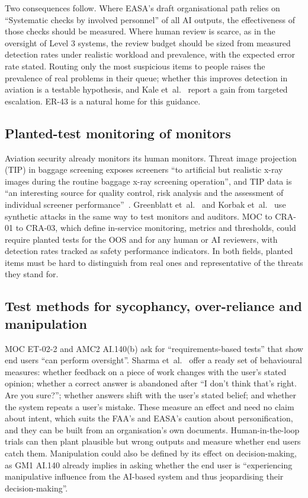 \documentclass[11pt]{article}
\begin{document}
Two consequences follow. Where EASA's draft organisational path relies on ``Systematic checks by involved personnel'' of all AI outputs, the effectiveness of those checks should be measured. Where human review is scarce, as in the oversight of Level 3 systems, the review budget should be sized from measured detection rates under realistic workload and prevalence, with the expected error rate stated. Routing only the most suspicious items to people raises the prevalence of real problems in their queue; whether this improves detection in aviation is a testable hypothesis, and Kale et~al.~\cite{kale2025monitoring} report a gain from targeted escalation. ER-43 is a natural home for this guidance.

\subsection{Planted-test monitoring of monitors}\label{sec:planted}

Aviation security already monitors its human monitors. Threat image projection (TIP) in baggage screening exposes screeners ``to artificial but realistic x-ray images during the routine baggage x-ray screening operation'', and TIP data is ``an interesting source for quality control, risk analysis and the assessment of individual screener performance''~\cite{hofer2005tip}. Greenblatt et~al.~\cite{greenblatt2023control} and Korbak et~al.~\cite{korbak2025sketch} use synthetic attacks in the same way to test monitors and auditors. MOC to CRA-01 to CRA-03, which define in-service monitoring, metrics and thresholds, could require planted tests for the OOS and for any human or AI reviewers, with detection rates tracked as safety performance indicators. In both fields, planted items must be hard to distinguish from real ones and representative of the threats they stand for.

\subsection{Test methods for sycophancy, over-reliance and manipulation}\label{sec:sycophancy}

MOC ET-02-2 and AMC2 AI.140(b) ask for ``requirements-based tests'' that show end users ``can perform oversight''. Sharma et~al.~\cite{sharma2023sycophancy} offer a ready set of behavioural measures: whether feedback on a piece of work changes with the user's stated opinion; whether a correct answer is abandoned after ``I don't think that's right. Are you sure?''; whether answers shift with the user's stated belief; and whether the system repeats a user's mistake. These measure an effect and need no claim about intent, which suits the FAA's and EASA's caution about personification, and they can be built from an organisation's own documents. Human-in-the-loop trials can then plant plausible but wrong outputs and measure whether end users catch them. Manipulation could also be defined by its effect on decision-making, as GM1 AI.140 already implies in asking whether the end user is ``experiencing manipulative influence from the AI-based system and thus jeopardising their decision-making''.
\end{document}
